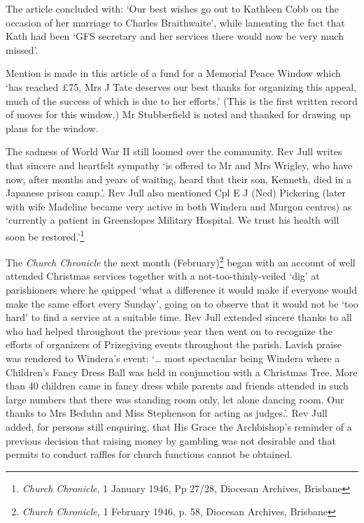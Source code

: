 The article concluded with: `Our best wishes go out to Kathleen Cobb on the occasion of her marriage to Charles Braithwaite', while lamenting the fact that Kath had been `GFS secretary and her services there would now be very much missed'.



Mention is made in this article of a fund for a Memorial Peace Window which `has reached \pounds75, Mrs J Tate deserves our best thanks for organizing this appeal, much of the success of which is due to her efforts.' (This is the first written record of moves for this window.) Mr Stubberfield is noted and thanked for drawing up plans for the window.



The sadness of World War II still loomed over the community. Rev Jull writes that sincere and heartfelt sympathy `is offered to Mr and Mrs Wrigley, who have now, after months and years of waiting, heard that their son, Kenneth, died in a Japanese prison camp.'. Rev Jull also mentioned Cpl E J (Ned) Pickering (later with wife Madeline became very active in both Windera and Murgon centres) as `currently a patient in Greenslopes Military Hospital. We trust his health will soon be restored.'\footnote{\emph{Church Chronicle}, 1 January 1946, Pp 27/28, Diocesan Archives, Brisbane}


The \emph{Church Chronicle} the next month (February)\footnote{\emph{Church Chronicle,} 1 February 1946, p. 58, Diocesan Archives, Brisbane} began with an account of well attended Christmas services together with a not-too-thinly-veiled `dig' at parishioners where he quipped `what a difference it would make if everyone would make the same effort every Sunday', going on to observe that it would not be `too hard' to find a service at a suitable time. Rev Jull extended sincere thanks to all who had helped throughout the previous year then went on to recognize the efforts of organizers of Prizegiving events throughout the parish. Lavish praise was rendered to Windera's event: `\ldots{} most spectacular being Windera where a Children's Fancy Dress Ball was held in conjunction with a Christmas Tree. More than 40 children came in fancy dress while parents and friends attended in such large numbers that there was standing room only, let alone dancing room. Our thanks to Mrs Beduhn and Miss Stephenson for acting as judges.'. Rev Jull added, for persons still enquiring, that His Grace the Archbishop's reminder of a previous decision that raising money by gambling was not desirable and that permits to conduct raffles for church functions cannot be obtained.



